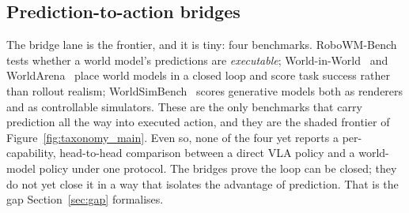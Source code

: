 


\subsection{Prediction-to-action bridges}
\label{sec:lane_bridge}

The bridge lane is the frontier, and it is tiny: four benchmarks. RoboWM-Bench~\cite{robowmbench}
tests whether a world model's predictions are \emph{executable}; World-in-World~\cite{worldinworld}
and WorldArena~\cite{worldarena} place world models in a closed loop and score task success rather
than rollout realism; WorldSimBench~\cite{worldsimbench} scores generative models both as renderers
and as controllable simulators. These are the only benchmarks that carry prediction all the way into
executed action, and they are the shaded frontier of Figure~\ref{fig:taxonomy_main}. Even so, none of
the four yet reports a per-capability, head-to-head comparison between a direct VLA policy and a
world-model policy under one protocol. The bridges prove the loop can be closed; they do not yet
close it in a way that isolates the advantage of prediction. That is the gap Section~\ref{sec:gap}
formalises.

\FloatBarrier
